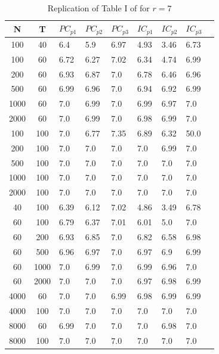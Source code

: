 \documentclass[12pt]{article}
\begin{document}
\label{bai ng information criteria}
\begin{table}[h!]
\caption{Replication of Table I of \citet{bai2002determining} for $r=7$}
 \\

\center

\begin{tabular}{cc|lllllll}

	N & T & $PC_{p1}$ & $PC_{p2}$ & $PC_{p3}$ & $IC_{p1}$ & $IC_{p2}$ & $IC_{p3}$\\
	\hline
		100 & 40 & 6.4 & 5.9 & 6.97 & 4.93 & 3.46 & 6.73 & \\ 
		100 & 60 & 6.72 & 6.27 & 7.02 & 6.34 & 4.74 & 6.99 & \\ 
		200 & 60 & 6.93 & 6.87 & 7.0 & 6.78 & 6.46 & 6.96 & \\ 
		500 & 60 & 6.99 & 6.96 & 7.0 & 6.94 & 6.92 & 6.99 & \\ 
		1000 & 60 & 7.0 & 6.99 & 7.0 & 6.99 & 6.97 & 7.0 & \\ 
		2000 & 60 & 7.0 & 6.99 & 7.0 & 6.98 & 6.99 & 7.0 & \\ 
		100 & 100 & 7.0 & 6.77 & 7.35 & 6.89 & 6.32 & 50.0 & \\ 
		200 & 100 & 7.0 & 7.0 & 7.0 & 7.0 & 6.99 & 7.0 & \\ 
		500 & 100 & 7.0 & 7.0 & 7.0 & 7.0 & 7.0 & 7.0 & \\ 
		1000 & 100 & 7.0 & 7.0 & 7.0 & 7.0 & 7.0 & 7.0 & \\ 
		2000 & 100 & 7.0 & 7.0 & 7.0 & 7.0 & 7.0 & 7.0 & \\ 
		40 & 100 & 6.39 & 6.12 & 7.02 & 4.86 & 3.49 & 6.78 & \\ 
		60 & 100 & 6.79 & 6.37 & 7.01 & 6.01 & 5.0 & 7.0 & \\ 
		60 & 200 & 6.93 & 6.85 & 7.0 & 6.82 & 6.58 & 6.98 & \\ 
		60 & 500 & 6.96 & 6.97 & 7.0 & 6.97 & 6.9 & 6.99 & \\ 
		60 & 1000 & 7.0 & 6.99 & 7.0 & 6.99 & 6.96 & 7.0 & \\ 
		60 & 2000 & 7.0 & 7.0 & 7.0 & 6.97 & 6.98 & 6.99 & \\ 
		4000 & 60 & 7.0 & 7.0 & 6.99 & 6.98 & 6.99 & 6.99 & \\ 
		4000 & 100 & 7.0 & 7.0 & 7.0 & 7.0 & 7.0 & 7.0 & \\ 
		8000 & 60 & 6.99 & 7.0 & 7.0 & 7.0 & 6.98 & 7.0 & \\ 
		8000 & 100 & 7.0 & 7.0 & 7.0 & 7.0 & 7.0 & 7.0 & \\ 

\end{tabular}
\end{table}
\end{document}
